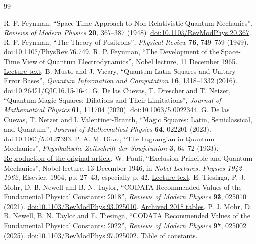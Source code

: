 \begin{thebibliography}{99}
{}
 R. P. Feynman, “Space-Time Approach to Non-Relativistic Quantum Mechanics”, \emph{Reviews of Modern Physics} \textbf{20}, 367--387 (1948). \href{https://doi.org/10.1103/RevModPhys.20.367}{doi:10.1103/RevModPhys.20.367}.
 R. P. Feynman, “The Theory of Positrons”, \emph{Physical Review} \textbf{76}, 749--759 (1949). \href{https://doi.org/10.1103/PhysRev.76.749}{doi:10.1103/PhysRev.76.749}.
 R. P. Feynman, “The Development of the Space-Time View of Quantum Electrodynamics”, Nobel lecture, 11 December 1965. \href{https://www.nobelprize.org/prizes/physics/1965/feynman/lecture/}{Lecture text}.
 B. Musto and J. Vicary, “Quantum Latin Squares and Unitary Error Bases”, \emph{Quantum Information and Computation} \textbf{16}, 1318--1332 (2016). \href{https://doi.org/10.26421/QIC16.15-16-4}{doi:10.26421/QIC16.15-16-4}.
 G. De las Cuevas, T. Drescher and T. Netzer, “Quantum Magic Squares: Dilations and Their Limitations”, \emph{Journal of Mathematical Physics} \textbf{61}, 111704 (2020). \href{https://doi.org/10.1063/5.0022344}{doi:10.1063/5.0022344}.
 G. De las Cuevas, T. Netzer and I. Valentiner-Branth, “Magic Squares: Latin, Semiclassical, and Quantum”, \emph{Journal of Mathematical Physics} \textbf{64}, 022201 (2023). \href{https://doi.org/10.1063/5.0127393}{doi:10.1063/5.0127393}.
 P. A. M. Dirac, “The Lagrangian in Quantum Mechanics”, \emph{Physikalische Zeitschrift der Sowjetunion} \textbf{3}, 64--72 (1933). \href{https://www.informationphilosopher.com/solutions/scientists/dirac/Lagrangian_1933.pdf}{Reproduction of the original article}.
 W. Pauli, “Exclusion Principle and Quantum Mechanics”, Nobel lecture, 13 December 1946, in \emph{Nobel Lectures, Physics 1942--1962}, Elsevier, 1964, pp. 27--43, especially p. 42. \href{https://www.nobelprize.org/uploads/2018/06/pauli-lecture.pdf}{Lecture text}.
 E. Tiesinga, P. J. Mohr, D. B. Newell and B. N. Taylor, “CODATA Recommended Values of the Fundamental Physical Constants: 2018”, \emph{Reviews of Modern Physics} \textbf{93}, 025010 (2021). \href{https://doi.org/10.1103/RevModPhys.93.025010}{doi:10.1103/RevModPhys.93.025010}. \href{https://physics.nist.gov/cuu/Constants/ArchiveASCII/allascii_2018.txt}{Archived 2018 tables}.
 P. J. Mohr, D. B. Newell, B. N. Taylor and E. Tiesinga, “CODATA Recommended Values of the Fundamental Physical Constants: 2022”, \emph{Reviews of Modern Physics} \textbf{97}, 025002 (2025). \href{https://doi.org/10.1103/RevModPhys.97.025002}{doi:10.1103/RevModPhys.97.025002}. \href{https://physics.nist.gov/cuu/Constants/Table/allascii.txt}{Table of constants}.

\end{thebibliography}
